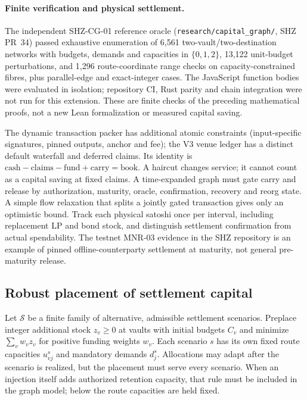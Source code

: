 \paragraph{Finite verification and physical settlement.} The independent SHZ-CG-01 reference oracle (\texttt{research/capital\_graph/}, SHZ PR~34) passed exhaustive enumeration of 6{,}561 two-vault/two-destination networks with budgets, demands and capacities in $\{0,1,2\}$, 13{,}122 unit-budget perturbations, and 1{,}296 route-coordinate range checks on capacity-constrained fibres, plus parallel-edge and exact-integer cases. The JavaScript function bodies were evaluated in isolation; repository CI, Rust parity and chain integration were not run for this extension. These are finite checks of the preceding mathematical proofs, not a new Lean formalization or measured capital saving.

The dynamic transaction packer has additional atomic constraints (input-specific signatures, pinned outputs, anchor and fee); the V3 venue ledger has a distinct default waterfall and deferred claims. Its identity is $\text{cash}-\text{claims}-\text{fund}+\text{carry}=\text{book}$. A haircut changes service; it cannot count as a capital saving at fixed claims. A time-expanded graph must gate carry and release by authorization, maturity, oracle, confirmation, recovery and reorg state. A simple flow relaxation that splits a jointly gated transaction gives only an optimistic bound. Track each physical satoshi once per interval, including replacement LP and bond stock, and distinguish settlement confirmation from actual spendability. The testnet MNR-03 evidence in the SHZ repository is an example of pinned offline-counterparty settlement at maturity, not general pre-maturity release.

\subsection{Robust placement of settlement capital}
\label{sec:rent-placement}

Let $\mathcal S$ be a finite family of alternative, admissible settlement scenarios. Preplace integer additional stock $z_v\ge0$ at vaults with initial budgets $C_v$ and minimize $\sum_v w_v z_v$ for positive funding weights $w_v$. Each scenario $s$ has its own fixed route capacities $u^s_{vj}$ and mandatory demands $d^s_j$. Allocations may adapt after the scenario is realized, but the placement must serve every scenario. When an injection itself adds authorized retention capacity, that rule must be included in the graph model; below the route capacities are held fixed.

